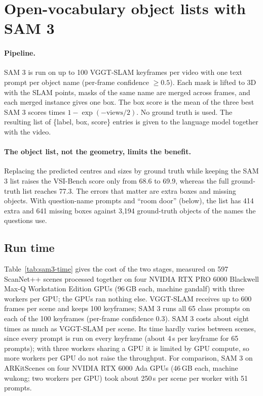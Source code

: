 
\section{Open-vocabulary object lists with SAM 3}
\label{sec:sam3}

\paragraph{Pipeline.}
SAM 3 is run on up to 100 VGGT-SLAM keyframes per video with one text prompt per object name
(per-frame confidence $\geq 0.5$). Each mask is lifted to 3D with the SLAM points, masks of the same name are
merged across frames, and each merged instance gives one box. The box score is the mean of the three best
SAM 3 scores times $1-\exp(-\mathrm{views}/2)$. No ground truth is used. The resulting list of
\{label, box, score\} entries is given to the language model together with the video.

\paragraph{The object list, not the geometry, limits the benefit.}
Replacing the predicted centres and sizes by ground truth while keeping the SAM 3 list raises the VSI-Bench
score only from 68.6 to 69.9, whereas the full ground-truth list reaches 77.3. The errors that matter are
extra boxes and missing objects. With question-name prompts and ``room door'' (below), the list has 414 extra
and 641 missing boxes against 3,194 ground-truth objects of the names the questions use.

\subsection{Run time}
\label{sec:sam3-time}

Table~\ref{tab:sam3-time} gives the cost of the two stages, measured on 597 ScanNet++ scenes processed together
on four NVIDIA RTX PRO 6000 Blackwell Max-Q Workstation Edition GPUs (96\,GB each, machine gandalf) with three
workers per GPU; the GPUs ran nothing else. VGGT-SLAM receives up to 600 frames per scene and
keeps 100 keyframes; SAM 3 runs all 65 class prompts on each of the 100 keyframes (per-frame confidence 0.3).
SAM 3 costs about eight times as much as VGGT-SLAM per scene. Its time hardly varies between scenes, since every
prompt is run on every keyframe (about 4\,s per keyframe for 65 prompts); with three workers sharing a GPU it is
limited by GPU compute, so more workers per GPU do not raise the throughput. For comparison, SAM 3 on ARKitScenes on
four NVIDIA RTX 6000 Ada GPUs (46\,GB each, machine wukong; two workers per GPU) took about
250\,s per scene per worker with 51 prompts.

